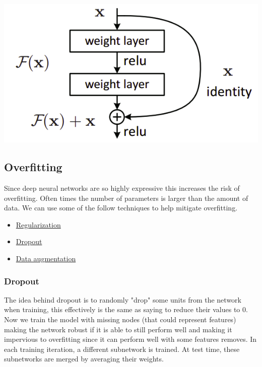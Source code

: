 \documentclass[12pt]{article}
\begin{document}
            \begin{center}
                \includegraphics[scale=0.5]{ResNet.png}
            \end{center}

    \subsection{Overfitting}
        Since deep neural networks are so highly expressive this increases the risk of overfitting. Often times the
        number of parameters is larger than the amount of data. We can use some of the follow techniques to help
        mitigate overfitting.
    
        \begin{itemize}
            \item \hyperref[sec:Regularization]{Regularization}
            \item \hyperref[sec:Dropout]{Dropout}
            \item \hyperref[sec:DataAugmentation]{Data augmentation}
        \end{itemize}

        \subsubsection{Dropout} \label{sec:Dropout}
            The idea behind dropout is to randomly "drop" some units from the network when training, this effectively is
            the same as saying to reduce their values to 0. Now we train the model with missing nodes (that could
            represent features) making the network robust if it is able to still perform well and making it impervious
            to overfitting since it can perform well with some features removes. In each training iteration, a different
            subnetwork is trained. At test time, these subnetworks are merged by averaging their weights.
\end{document}
